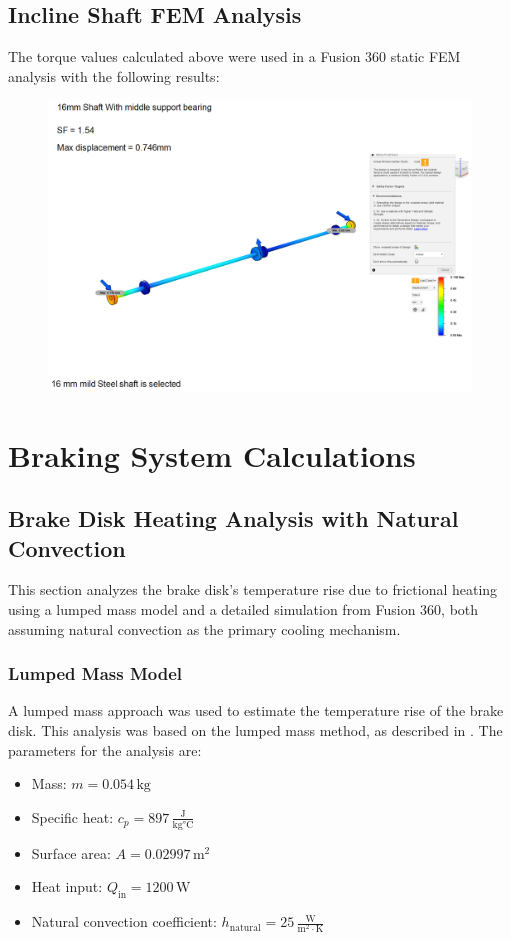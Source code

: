 \section{Incline Shaft FEM Analysis}
\label{calcs:incline-shaft}
The torque values calculated above were used in a Fusion 360 static FEM analysis with the following results:
\begin{figure}[H]
    \centering
    \includegraphics[width=1\linewidth]{chaps-append/calcs/tilt_shaft_FEM.png}
\end{figure}




\chapter{Braking System Calculations}
\label{appx:braking-calcs}

\section{Brake Disk Heating Analysis with Natural Convection}
\label{calcs:brake-disk-heat}
This section analyzes the brake disk's temperature rise due to frictional heating using a lumped mass model and a detailed simulation from Fusion 360, both assuming natural convection as the primary cooling mechanism.

\subsection*{Lumped Mass Model}
A lumped mass approach was used to estimate the temperature rise of the brake disk. 
This analysis was based on the lumped mass method, as described in \cite{cengel2015heat}.
The parameters for the analysis are:
\begin{itemize}
    \item Mass: \( m = 0.054 \, \text{kg} \)
    \item Specific heat: \( c_p = 897 \, \frac{\text{J}}{\text{kg°C}} \)
    \item Surface area: \( A = 0.02997 \, \text{m}^2 \)
    \item Heat input: \( Q_{\text{in}} = 1200 \, \text{W} \)
    \item Natural convection coefficient: \( h_{\text{natural}} = 25 \, \frac{\text{W}}{\text{m}^2 \cdot \text{K}} \)
\end{itemize}

